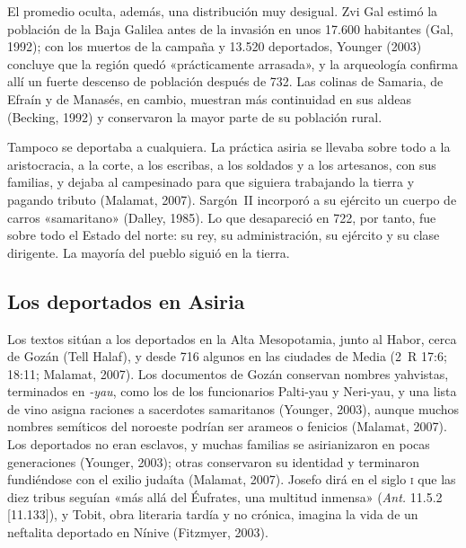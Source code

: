 El promedio oculta, además, una distribución muy desigual. Zvi Gal estimó la población de la Baja Galilea antes de la invasión en unos 17.600 habitantes (Gal, 1992); con los muertos de la campaña y 13.520 deportados, Younger (2003) concluye que la región quedó «prácticamente arrasada», y la arqueología confirma allí un fuerte descenso de población después de 732. Las colinas de Samaria, de Efraín y de Manasés, en cambio, muestran más continuidad en sus aldeas (Becking, 1992) y conservaron la mayor parte de su población rural.

Tampoco se deportaba a cualquiera. La práctica asiria se llevaba sobre todo a la aristocracia, a la corte, a los escribas, a los soldados y a los artesanos, con sus familias, y dejaba al campesinado para que siguiera trabajando la tierra y pagando tributo (Malamat, 2007). Sargón~II incorporó a su ejército un cuerpo de carros «samaritano» (Dalley, 1985). Lo que desapareció en 722, por tanto, fue sobre todo el Estado del norte: su rey, su administración, su ejército y su clase dirigente. La mayoría del pueblo siguió en la tierra.

\subsection{Los deportados en Asiria}
Los textos sitúan a los deportados en la Alta Mesopotamia, junto al Habor, cerca de Gozán (Tell Halaf), y desde 716 algunos en las ciudades de Media (2~R 17:6; 18:11; Malamat, 2007). Los documentos de Gozán conservan nombres yahvistas, terminados en \emph{-yau}, como los de los funcionarios Palti-yau y Neri-yau, y una lista de vino asigna raciones a sacerdotes samaritanos (Younger, 2003), aunque muchos nombres semíticos del noroeste podrían ser arameos o fenicios (Malamat, 2007). Los deportados no eran esclavos, y muchas familias se asirianizaron en pocas generaciones (Younger, 2003); otras conservaron su identidad y terminaron fundiéndose con el exilio judaíta (Malamat, 2007). Josefo dirá en el siglo \textsc{i} que las diez tribus seguían «más allá del Éufrates, una multitud inmensa» (\emph{Ant.} 11.5.2 [11.133]), y Tobit, obra literaria tardía y no crónica, imagina la vida de un neftalita deportado en Nínive (Fitzmyer, 2003).

